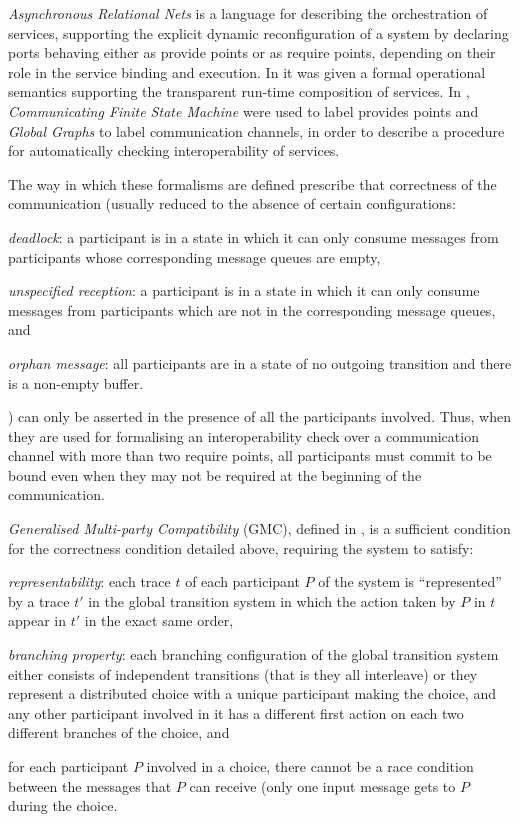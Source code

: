 \emph{Asynchronous Relational Nets} \cite{fiadeiro:fase2011} is a language for describing the orchestration of services, supporting the explicit dynamic reconfiguration of a system by declaring ports behaving either as provide points or as require points, depending on their role in the service binding and execution. In \cite{vissani:wadt14-f} it was given a formal operational semantics supporting the transparent run-time composition of services. In \cite{vissani:places15}, \emph{Communicating Finite State Machine} \cite{brand:jacm-30_2} were used to label provides points and \emph{Global Graphs} \cite{denielou:esop12} to label communication channels, in order to describe a procedure for automatically checking interoperability of services.

The way in which these formalisms are defined prescribe that correctness of the communication (usually reduced to the absence of certain configurations\cite{lange:popl15}:
\begin{inparaenum}[1)]
\item \emph{deadlock}: a participant is in a state in which it can only consume messages from participants whose corresponding message queues are empty,
\item \emph{unspecified reception}: a participant is in a state in which it can only consume messages from participants which are not in the corresponding message queues, and
\item \emph{orphan message}: all participants are in a state of no outgoing transition and there is a non-empty buffer.
\end{inparaenum}
) can only be asserted in the presence of all the participants involved. Thus, when they are used for formalising an interoperability check over a communication channel with more than two require points, all participants must commit to be bound even when they may not be required at the beginning of the communication.

\emph{Generalised Multi-party Compatibility} (GMC), defined in \cite{lange:popl15}, is a sufficient condition for the correctness condition detailed above, requiring the system to satisfy:
\begin{inparaenum}[1)]
\item \emph{representability}: each trace $t$ of each participant $P$ of the system is ``represented'' by a trace $t'$ in the global transition system in which the action taken by $P$ in $t$ appear in $t'$ in the exact same order, 
\item \emph{branching property}: each branching configuration of the global transition system either consists of independent transitions (that is they all interleave) or they represent a distributed choice with a unique participant making the choice, and any other participant involved in it has a different first action on each two different branches of the choice, and 
\item for each participant $P$ involved in a choice, there cannot be a race condition between the messages that $P$ can receive (only one input message gets to $P$ during the choice.
\end{inparaenum}

